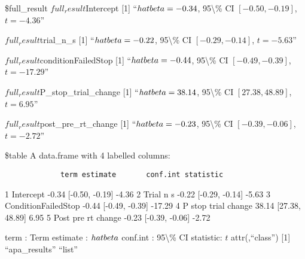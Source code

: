 \documentclass[
  man]{apa6}
\begin{document}
\$full\_result
\(full_result\)Intercept
{[}1{]} ``\(\\hat{\\beta} = -0.34\), 95\textbackslash\% CI \([-0.50, -0.19]\), \(t = -4.36\)''

\(full_result\)trial\_n\_s
{[}1{]} ``\(\\hat{\\beta} = -0.22\), 95\textbackslash\% CI \([-0.29, -0.14]\), \(t = -5.63\)''

\(full_result\)conditionFailedStop
{[}1{]} ``\(\\hat{\\beta} = -0.44\), 95\textbackslash\% CI \([-0.49, -0.39]\), \(t = -17.29\)''

\(full_result\)P\_stop\_trial\_change
{[}1{]} ``\(\\hat{\\beta} = 38.14\), 95\textbackslash\% CI \([27.38, 48.89]\), \(t = 6.95\)''

\(full_result\)post\_pre\_rt\_change
{[}1{]} ``\(\\hat{\\beta} = -0.23\), 95\textbackslash\% CI \([-0.39, -0.06]\), \(t = -2.72\)''

\$table
A data.frame with 4 labelled columns:

\begin{verbatim}
             term estimate       conf.int statistic
\end{verbatim}

1 Intercept -0.34 {[}-0.50, -0.19{]} -4.36
2 Trial n s -0.22 {[}-0.29, -0.14{]} -5.63
3 ConditionFailedStop -0.44 {[}-0.49, -0.39{]} -17.29
4 P stop trial change 38.14 {[}27.38, 48.89{]} 6.95
5 Post pre rt change -0.23 {[}-0.39, -0.06{]} -2.72

term : Term
estimate : \(\\hat{\\beta}\)
conf.int : 95\textbackslash\% CI
statistic: \(t\)
attr(,``class'')
{[}1{]} ``apa\_results'' ``list''

\newpage
\end{document}
